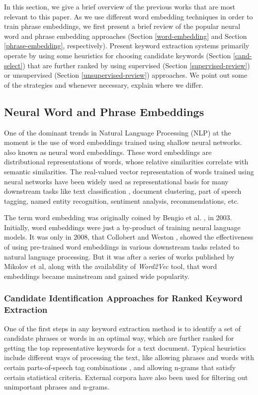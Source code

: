 \documentclass[conference]{IEEEtran}
\begin{document}
In this section, we give a brief overview of the previous works that are most relevant to this paper. As we use different word embedding techniques in order to train phrase embeddings, we first present a brief review of the popular neural word and phrase embedding approaches (Section \ref{word-embedding} and Section \ref{phrase-embedding}, respectively). Present keyword extraction systems primarily operate by using some heuristics for choosing candidate keywords (Section \ref{cand-select}) that are further ranked by using supervised (Section \ref{supervised-review}) or unsupervised (Section \ref{unsupervised-review}) approaches. We point out some of the strategies and whenever necessary, explain where we differ.

\subsection{Neural Word and Phrase Embeddings\label{word-embedding}}
One of the dominant trends in Natural Language Processing (NLP) at the moment is the use of word embeddings trained using shallow neural networks. also known as neural word embeddings. These word embeddings are distributional representations of words, whose relative similarities correlate with semantic similarities. The real-valued vector representation of words trained using neural networks have been widely used as representational basis for many downstream tasks like text classification \cite{joulin2016bag}, document clustering, part of speech tagging, named entity recognition, sentiment analysis, recommendations, etc.

The term word embedding was originally coined by Bengio et al. \cite{bengio2003neural}, in 2003. Initially, word embeddings were just a by-product of training neural language models. It was only in 2008, that Collobert and Weston \cite{collobert2008unified}, showed the effectiveness of using pre-trained word embeddings in various downstream tasks related to natural language processing. But it was after a series of works published by Mikolov et al, \cite{mikolov2013efficient, mikolov2013distributed, le2014distributed} along with the availability of \textit{Word2Vec} tool, that word embeddings became mainstream and gained wide popularity. 

\subsubsection{Candidate Identification Approaches for Ranked Keyword Extraction\label{cand-select}}
One of the first steps in any keyword extraction method is to identify a set of candidate phrases or words in an optimal way, which are further ranked for getting the top representative keywords for a text document. Typical heuristics include different ways of processing the text, like allowing phrases and words with certain parts-of-speech tag combinations \cite{mihalcea2004textrank}, and allowing n-grams \cite{danesh2015sgrank} that satisfy certain statistical criteria. External corpora have also been used for filtering out unimportant phrases and n-grams.
\end{document}
